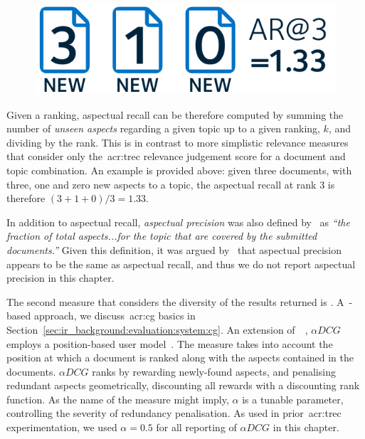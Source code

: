 \begin{figure}
    \begin{center}
    \vspace*{-10mm}
    \includegraphics[width=1\textwidth]{figures/ch8-aspectual_recall.pdf}
    \end{center}
    \label{fig:aspectual_recall}
\end{figure}

Given a ranking, aspectual recall can be therefore computed by summing the number of \emph{unseen aspects} regarding a given topic up to a given ranking, $k$, and dividing by the rank. This is in contrast to more simplistic relevance measures that consider only the~\gls{acr:trec} relevance judgement score for a document and topic combination. An example is provided above: given three documents, with three, one and zero new aspects to a topic, the aspectual recall at rank 3 is therefore $(3+1+0)/3 = 1.33$.

In addition to aspectual recall, \emph{aspectual precision} was also defined by~\cite{over2001trec} as \emph{``the fraction of total aspects...for the topic that are covered by the submitted documents.''} Given this definition, it was argued by~\cite{sanderson2010test} that aspectual precision appears to be the same as aspectual recall, and thus we do not report aspectual precision in this chapter.

The second measure that considers the diversity of the results returned is . A~-based approach, we discuss~\gls{acr:cg} basics in Section~\ref{sec:ir_background:evaluation:system:cg}. An extension of~~\citep{jarvelin2002cg}, $\alpha DCG$ employs a position-based user model~\citep{clarke2008adcg}. The measure takes into account the position at which a document is ranked along with the aspects contained in the documents. $\alpha DCG$ ranks by rewarding newly-found aspects, and penalising redundant aspects geometrically, discounting all rewards with a discounting rank function. As the name of the measure might imply, $\alpha$ is a tunable parameter, controlling the severity of redundancy penalisation. As used in prior~\gls{acr:trec} experimentation, we used $\alpha=0.5$ for all reporting of $\alpha DCG$ in this chapter.


